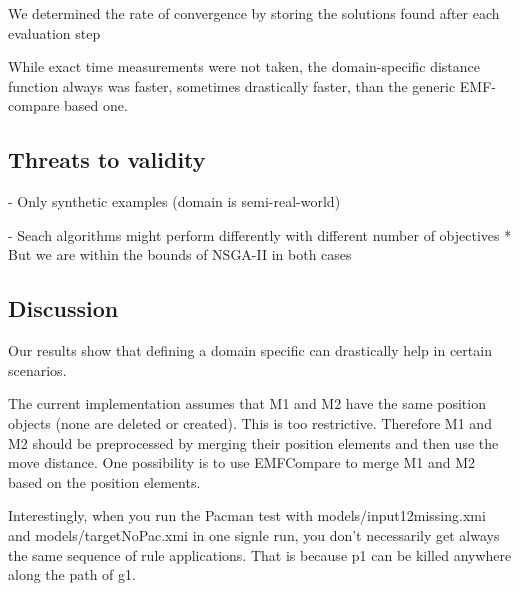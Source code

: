 We determined the rate of convergence by storing the solutions found after each evaluation step





While exact time measurements were not taken, the domain-specific distance function always was faster, sometimes drastically faster,
than the generic EMF-compare based one. 



\subsection{Threats to validity}

- Only synthetic examples (domain is semi-real-world)

- Seach algorithms might perform differently with different number of objectives
 * But we are within the bounds of NSGA-II in both cases

\subsection{Discussion}


Our results show that defining a domain specific can drastically help in certain scenarios.

The current implementation assumes that M1 and M2 have the same position objects (none are deleted or created). This is too restrictive. Therefore M1 and M2 should be preprocessed by merging their position elements and then use the move distance. One possibility is to use EMFCompare to merge M1 and M2 based on the position elements.

Interestingly, when you run the Pacman test with models/input12missing.xmi and models/targetNoPac.xmi in one signle run, you don't necessarily get always the same sequence of rule applications. That is because p1 can be killed anywhere along the path of g1.